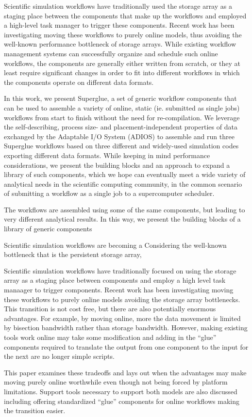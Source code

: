 Scientific simulation workflows have traditionally used
the storage array as a staging place between the components
that make up the workflows and employed a high-level
task manager to trigger these components.
Recent work has been investigating moving these
workflows to purely online models, thus avoiding the
well-known performance bottleneck of storage arrays.
While existing workflow management systems
can successfully organize and schedule such
online workflows, the components are generally
either written from scratch, or they at least require
significant changes in order to fit into different workflows
in which the components operate on different
data formats.

In this work, we present Superglue, a set of generic workflow
components that can be used to assemble a variety of online,
static (ie. submitted as single jobs) workflows from start to finish without
the need for re-compilation. We leverage the self-describing,
process size- and placement-independent properties of data exchanged
by the Adaptable I/O System (ADIOS) to assemble and run three
Superglue workflows based on three different and widely-used simulation
codes exporting different data formats.
While keeping in mind performance considerations, we present the
building blocks and an approach to expand a library of such components,
which we hope can eventually meet a wide variety of analytical needs
in the scientific computing community, in the common scenario of
submitting a workflow as a single job to a supercomputer scheduler.


The workflows are assembled using
some of the same components, but leading to very different analytical results.
In this way, we present the building blocks of a library of generic components


Scientific simulation workflows are becoming a 
Considering the well-known bottleneck that is the persistent storage array,


Scientific simulation workflows have traditionally focused on using the storage
array as a staging place between components and employ a high level task
manaager to trigger components. Recent work has been investigating moving these
workflows to purely online models avoiding the storage array bottlenecks. This
transition is not cost free, but there are also potentially enormous advantages.
For example, by moving online, more the data movement is limited by bisection
bandwidth rather than storage bandwidth. However, making existing tools work
online may take some modification and adding in the ``glue'' components required
to translate the output from one component to the input for the next are no
longer simple scripts.

This paper examines these tradeoffs and lays out when the advantages may make
moving purely online worthwhile even though not being forced by platform
limitations. Support tools necessary to support both models are also discussed
including offering standardized ``glue'' components for online workflows making
the transition easier.
\endif
